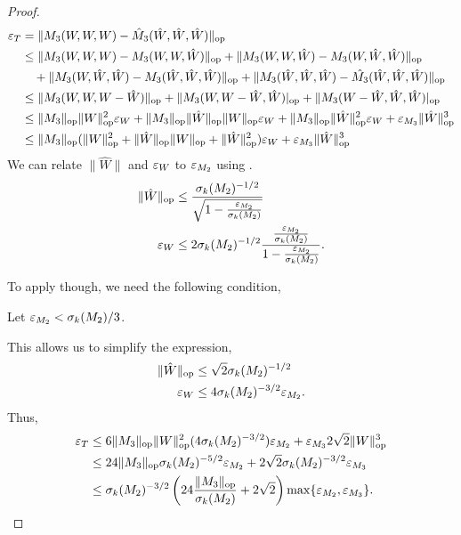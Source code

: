 \begin{proof}
\begin{align*}
  \varepsilon_{T} &= \|M_3(W,W,W) - \hat M_3(\hat W,\hat W, \hat W)\|_{\text{\rm op}} \\
           &\le 
           \| {M_3}(W,W,W) - {M_3}(W,W,\hat W) \|_{\text{\rm op}}
           + \| {M_3}(W,W,\hat W) - {M_3}(W, \hat W, \hat W)\|_{\text{\rm op}} \\
           &\quad 
           + \|{M_3}(W,\hat W,\hat W) - {M_3}(\hat W, \hat W, \hat W)\|_{\text{\rm op}} 
           + \|{M_3}(\hat W,\hat W,\hat W) - \hat {M_3}(\hat W,\hat W, \hat W)\|_{\text{\rm op}} \\
           &\le 
           \| {M_3}(W,W,W - \hat W) \|_{\text{\rm op}}
           + \| {M_3}(W,W - \hat W,\hat W) |_{\text{\rm op}} 
           + \|{M_3}(W - \hat W,\hat W,\hat W) |_{\text{\rm op}} \\
           &\le
           \| {M_3} \|_{\text{\rm op}} \|W\|^2_{\text{\rm op}} \varepsilon_{W} +
            \| {M_3} \|_{\text{\rm op}} \|\hat W\|_{\text{\rm op}} \|W\|_{\text{\rm op}} \varepsilon_{W} +
            \| {M_3} \|_{\text{\rm op}} \|\hat W\|^2_{\text{\rm op}} \varepsilon_{W} +
            \varepsilon_{M_3} \|\hat W\|^3_{\text{\rm op}}  \\
           &\le
           \| {M_3} \|_{\text{\rm op}} (\|W\|^2_{\text{\rm op}} + \|\hat W\|_{\text{\rm op}} \|W\|_{\text{\rm op}} + \|\hat W\|^2_{\text{\rm op}}) \varepsilon_{W} +
            \varepsilon_{M_3} \|\hat W\|^3_{\text{\rm op}} 
\end{align*}
We can relate $\|\hat W\|$ and $\varepsilon_{W}$ to $\varepsilon_{M_2}$ using 
. 
\begin{align*}
  \|\hat W\|_{\text{\rm op}} 
  &\le \frac{\sigma_k(M_2)^{-1/2}}{\sqrt{1 - \frac{\varepsilon_{M_2}}{\sigma_k(M_2)} }} \\
  \varepsilon_{W} 
  &\le 2 \sigma_k(M_2)^{-1/2} \frac{\frac{\varepsilon_{M_2}}{\sigma_k(M_2)}}{1 - \frac{\varepsilon_{M_2}}{\sigma_k(M_2)}}.
\end{align*}

To apply  though, we need the following condition,
\begin{condition}
  Let $\varepsilon_{M_2} < \sigma_k(M_2)/3$.
\end{condition}

This allows us to simplify the expression,
\begin{align*}
  \|\hat W\|_{\text{\rm op}} &\le \sqrt{2} \sigma_k(M_2)^{-1/2} \\
  \varepsilon_{W} &\le 4 \sigma_k(M_2)^{-3/2} \varepsilon_{M_2}.
\end{align*}
Thus,
\begin{align*}
  \varepsilon_{T} &\le 
  6 \| {M_3} \|_{\text{\rm op}} \|W\|^2_{\text{\rm op}} (4 \sigma_k(M_2)^{-3/2}) \varepsilon_{M_2} +
  \varepsilon_{M_3} 2\sqrt{2} \|W\|^3_{\text{\rm op}} \\
  &\le 
  24 \| {M_3} \|_{\text{\rm op}} \sigma_k(M_2)^{-5/2} \varepsilon_{M_2} +
  2\sqrt{2} \sigma_k(M_2)^{-3/2} \varepsilon_{M_3} \\
  &\le 
    \sigma_k(M_2)^{-3/2}
      \left(24 \frac{\| {M_3} \|_{\text{\rm op}}}{\sigma_k(M_2)} + 2\sqrt{2} \right)
      \max\{ \varepsilon_{M_2}, \varepsilon_{M_3} \}.
\end{align*}


\end{proof}
